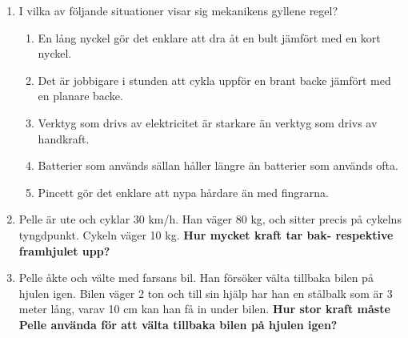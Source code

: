 \documentclass[11pt]{article}
\begin{document}
\begin{enumerate}[itemsep=2em]
        \item
              I vilka av följande situationer visar sig mekanikens gyllene regel?
              \begin{enumerate}[label=\textbf{\alph*.}]
                      \item En lång nyckel gör det enklare att dra åt en bult jämfört med en kort nyckel.
                      \item Det är jobbigare i stunden att cykla uppför en brant backe jämfört med en planare backe.
                      \item Verktyg som drivs av elektricitet är starkare än verktyg som drivs av handkraft.
                      \item Batterier som används sällan håller längre än batterier som används ofta.
                      \item Pincett gör det enklare att nypa hårdare än med fingrarna.
              \end{enumerate}

        \item
              \begin{minipage}[t]{0.5\textwidth}
                      Pelle är ute och cyklar 30 km/h. Han väger 80 kg, och sitter precis på cykelns tyngdpunkt. Cykeln väger 10 kg. \textbf{Hur mycket kraft tar bak- respektive framhjulet upp?}
              \end{minipage}
              \hspace{1em}
              \begin{adjustbox}{valign=t}
                      
              \end{adjustbox}

        \item
              Pelle åkte och välte med farsans bil. Han försöker välta tillbaka bilen på hjulen igen. Bilen väger 2 ton och till sin hjälp har han en stålbalk som är 3 meter lång, varav 10 cm kan han få in under bilen. \textbf{Hur stor kraft måste Pelle använda för att välta tillbaka bilen på hjulen igen?}
              \begin{center}
                      
              \end{center}


\end{enumerate}
\end{document}
